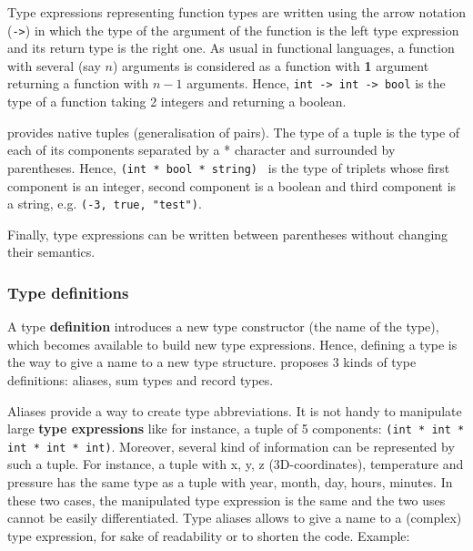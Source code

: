 Type expressions representing function types are written using the
arrow notation ({\tt ->}) in which the type of the argument of the
function is the left type expression and its return type is the right
one. As usual in functional languages, a function with several (say
$n$) arguments is considered as a function with {\bf 1} argument
returning a function with $n-1$ arguments. Hence,
{\tt int -> int -> bool} is the type of a function taking 2 integers
and returning a boolean.

{\focal} provides native tuples (generalisation of pairs). The type of
a tuple is the type of each of its components separated by a *
character and surrounded by parentheses. Hence,
{\tt (int * bool * string) } is the type of triplets whose first
component is an integer, second component is a boolean and third
component is a string, e.g. {\tt (-3, true, "test")}.

Finally, type expressions can be written between parentheses without
changing their semantics.

\subsubsection{Type definitions}
\label{type-definition}
A type {\bf definition} introduces  a new type
 constructor (the name of the type), which becomes available to build
new type expressions. Hence, defining a type is the
way to give a name to a new type structure. {\focal} proposes 3 kinds
of type definitions: aliases, sum types and record types.

\vspace{0.5cm}


\bigskip

Aliases provide a way to create type abbreviations. It is not handy to
manipulate large {\bf type expressions} like for instance, a tuple of
5 components: {\tt (int * int * int * int * int)}. Moreover, several
kind of information can be represented by such a
tuple. For instance, a tuple with x, y, z (3D-coordinates), temperature and
pressure has the same type as a tuple with year, month, day, hours, minutes. In
these two cases, the manipulated type expression is the same and
the two uses cannot be easily differentiated. Type aliases allows to
give a name to a
(complex) type expression, for sake of readability or to shorten the
code. Example:

